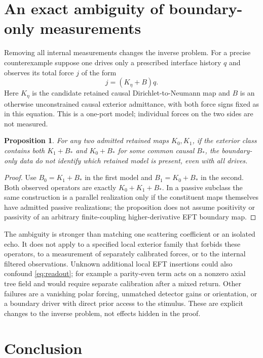 \documentclass[11pt]{article}
\newtheorem{proposition}[theorem]{Proposition}
\begin{document}
\section{An exact ambiguity of boundary-only measurements}\label{sec:port}

Removing all internal measurements changes the inverse problem. For a precise counterexample suppose one drives only a prescribed interface history $q$ and observes its total force $j$ of the form
\begin{equation}\label{eq:admittance}
 j=(K_\eta+B)q .
\end{equation}
Here $K_\eta$ is the candidate retained causal Dirichlet-to-Neumann map and $B$ is an otherwise unconstrained causal exterior admittance, with both force signs fixed as in this equation. This is a one-port model; individual forces on the two sides are not measured.

\begin{proposition}\label{prop:port}
For any two admitted retained maps $K_0,K_1$, if the exterior class contains both $K_1+B_*$ and $K_0+B_*$ for some common causal $B_*$, the boundary-only data do not identify which retained model is present, even with all drives.
\end{proposition}
\begin{proof}
Use $B_0=K_1+B_*$ in the first model and $B_1=K_0+B_*$ in the second. Both observed operators are exactly $K_0+K_1+B_*$. In a passive subclass the same construction is a parallel realization only if the constituent maps themselves have admitted passive realizations; the proposition does not assume positivity or passivity of an arbitrary finite-coupling higher-derivative EFT boundary map.
\end{proof}

The ambiguity is stronger than matching one scattering coefficient or an isolated echo. It does not apply to a specified local exterior family that forbids these operators, to a measurement of separately calibrated forces, or to the internal filtered observations. Unknown additional local EFT insertions could also confound \eqref{eq:readout}; for example a parity-even term acts on a nonzero axial tree field and would require separate calibration after a mixed return. Other failures are a vanishing polar forcing, unmatched detector gains or orientation, or a boundary driver with direct prior access to the stimulus. These are explicit changes to the inverse problem, not effects hidden in the proof.

\section{Conclusion}
\end{document}
